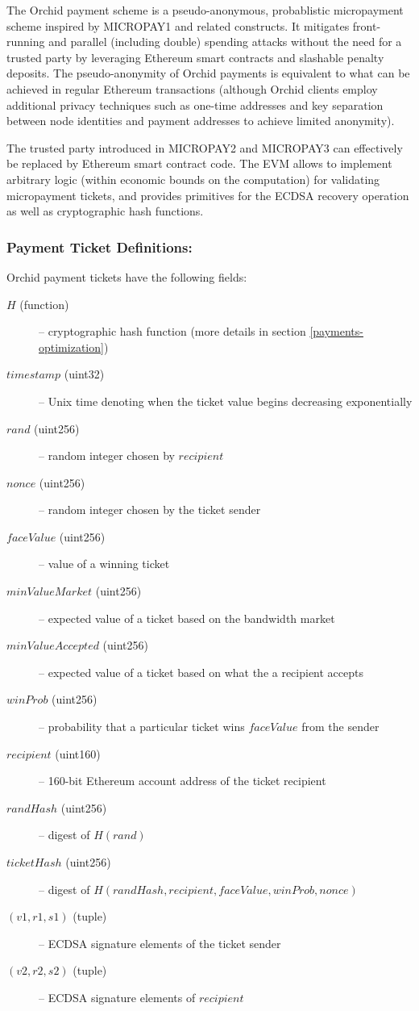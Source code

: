 The Orchid payment scheme is a pseudo-anonymous, probablistic micropayment scheme inspired by MICROPAY1 and related constructs. It mitigates front-running and parallel (including double) spending attacks without the need for a trusted party by leveraging Ethereum smart contracts and slashable penalty deposits. The pseudo-anonymity of Orchid payments is equivalent to what can be achieved in regular Ethereum transactions (although Orchid clients employ additional privacy techniques such as one-time addresses and key separation between node identities and payment addresses to achieve limited anonymity).

The trusted party introduced in MICROPAY2 and MICROPAY3 can effectively be replaced by Ethereum smart contract code. The EVM allows to implement arbitrary logic (within economic bounds on the computation) for validating micropayment tickets, and provides primitives\cite{ETHSpec} for the ECDSA\cite{ECDSA} recovery operation as well as cryptographic hash functions.

\subsubsection{Payment Ticket Definitions:}
\label{payments-definitions}

Orchid payment tickets have the following fields:
\begin{description}%
  \item [$H$ (function)] -- cryptographic hash function (more details in section \ref{payments-optimization})
  \item [$timestamp$ (uint32)] -- Unix time denoting when the ticket value begins decreasing exponentially
  \item [$rand$ (uint256)] -- random integer chosen by $recipient$
  \item [$nonce$ (uint256)] -- random integer chosen by the ticket sender
  \item [$faceValue$ (uint256)] -- value of a winning ticket
  \item [$minValueMarket$ (uint256)] -- expected value of a ticket based on the bandwidth market
  \item [$minValueAccepted$ (uint256)] -- expected value of a ticket based on what the a recipient accepts
  \item [$winProb$ (uint256)] -- probability that a particular ticket wins $faceValue$ from the sender
  \item [$recipient$ (uint160)] -- 160-bit Ethereum account address of the ticket recipient
  \item [$randHash$ (uint256)] -- digest of $H(rand)$
  \item [$ticketHash$ (uint256)] -- digest of $H(randHash, recipient, faceValue, winProb, nonce)$
  \item [$(v1, r1, s1)$ (tuple)] -- ECDSA signature elements of the ticket sender
  \item [$(v2, r2, s2)$ (tuple)] -- ECDSA signature elements of $recipient$
\end{description}

